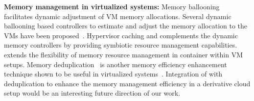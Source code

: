 \noindent
{\bf Memory management in virtualized systems:} Memory 
ballooning~\cite{vmware,hotplug} facilitates dynamic adjustment of VM memory  
allocations.
%
Several dynamic ballooning based controllers to estimate and adjust the memory 
allocation to the VMs have been proposed~\cite{wss, membal, tws}.
%
Hypervisor caching and \dd{} complements the dynamic memory controllers
by providing symbiotic resource management capabilities.
%
\dd{} extends the flexibility of memory resource management in container 
within VM setups.
%
Memory deduplication~\cite{vmware,ksmpaper,satori} is another memory
efficiency enhancement technique shown to be useful in virtualized
systems~\cite{ksmpaper,utc}.   
%
Integration of \dd{} with deduplication to enhance the memory management
efficiency in a derivative cloud setup would be an interesting future
direction of our work.
%
%

